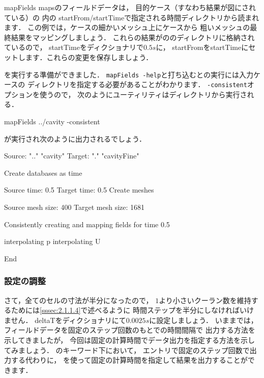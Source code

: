 mapFields mapsのフィールドデータは，
目的ケース（すなわち結果が図にされている）の
%
%
内の
startFrom/startTimeで指定される時間ディレクトリから読まれます．
この例では，ケースの細かいメッシュ上にケースから
粗いメッシュの最終結果をマッピングしましょう．
これらの結果がののディレクトリに格納されているので，
startTimeをディクショナリで$0.5\unit{s}$に，
startFromをstartTimeにセットします．これらの変更を保存しましょう．

を実行する準備ができました．
\texttt{mapFields -help}と打ち込むとの実行には入力ケースの
ディレクトリを指定する必要があることがわかります．
\texttt{-consistent}オプションを使うので，
次のようにユーティリティはディレクトリから実行される．
\begin{OFverbatim}[terminal]
mapFields ../cavity -consistent
\end{OFverbatim}
が実行され次のように出力されるでしょう．
\begin{OFverbatim}[baselinestretch=0.8, weight=\small]
Source: ".." "cavity"
Target: "." "cavityFine"

Create databases as time

Source time: 0.5
Target time: 0.5
Create meshes

Source mesh size: 400   Target mesh size: 1681

Consistently creating and mapping fields for time 0.5

    interpolating p
    interpolating U

End
\end{OFverbatim}

\subsubsection{設定の調整}
\label{sssec:2.1.5.4}
さて，全てのセルの寸法が半分になったので，
$1$より小さいクーラン数を維持するためには\autoref{sssec:2.1.1.4}で述べるように
時間ステップを半分にしなければいけません．
deltaTをディクショナリにて$0.0025\unit{s}$に設定しましょう．
いままでは，フィールドデータを固定のステップ回数のもとでの時間間隔で
出力する方法を示してきましたが，
今回は固定の計算時間でデータ出力を指定する方法を示してみましょう．
のキーワード下において，
%
%
エントリで固定のステップ回数で出力する代わりに，
%
%
を使って固定の計算時間を指定して結果を出力することができます．

